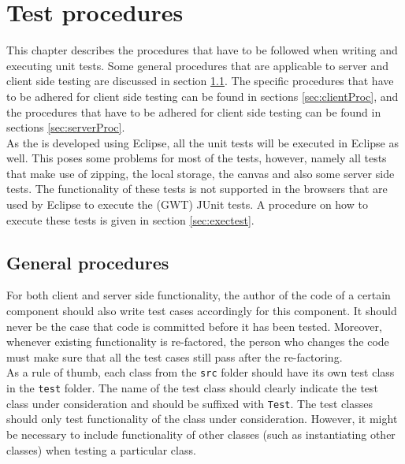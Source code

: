\chapter{Test procedures}\label{chap:testProc}
This chapter describes the procedures that have to be followed when writing and executing unit tests. Some general procedures that are applicable to server and client side testing are discussed in section \ref{sec:genProc}. The specific procedures that have to be adhered for client side testing can be found in sections \ref{sec:clientProc}, and the procedures that have to be adhered for client side testing can be found in sections \ref{sec:serverProc}.\\
As the \applicationname{} is developed using Eclipse, all the unit tests will be executed in Eclipse as well. This poses some problems for most of the tests, however, namely all tests that make use of zipping, the local storage, the canvas and also some server side tests. The functionality of these tests is not supported in the browsers that are used by Eclipse to execute the (GWT) JUnit tests. A procedure on how to execute these tests is given in section \ref{sec:exectest}.

\section{General procedures}\label{sec:genProc}
For both client and server side functionality, the author of the code of a certain component should also write test cases accordingly for this component. It should never be the case that code is committed before it has been tested. Moreover, whenever existing functionality is re-factored, the person who changes the code must make sure that all the test cases still pass after the re-factoring. \\
As a rule of thumb, each class from the \texttt{src} folder should have its own test class in the \texttt{test} folder. The name of the test class should clearly indicate the test class under consideration and should be suffixed with \texttt{Test}. The test classes should only test functionality of the class under consideration. However, it might be necessary to include functionality of other classes (such as instantiating other classes) when testing a particular class.

